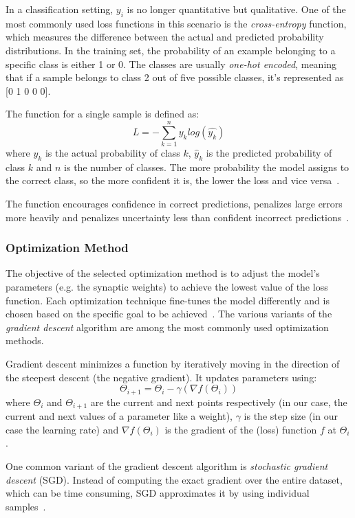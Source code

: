 \documentclass[a4paper,oneside,onecolumn,12pt]{book}
\begin{document}
		In a classification setting, $y_i$ is no longer quantitative but qualitative. One of the most commonly used loss functions in this scenario is the \textit{cross-entropy} function, which measures the difference between the actual and predicted probability distributions. In the training set, the probability of an example belonging to a specific class is either 1 or 0. The classes are usually \textit{one-hot encoded}, meaning that if a sample belongs to class 2 out of five possible classes, it's represented as [0 1 0 0 0].

		The function for a single sample is defined as:
		\[ L = -\sum_{k=1}^{n} y_k log(\hat{y_k}) \]
		where $y_k$ is the actual probability of class $k$, $\hat{y}_k$ is the predicted probability of class $k$ and $n$ is the number of classes. The more probability the model assigns to the correct class, so the more confident it is, the lower the loss and vice versa~\cite{AISL}.

		The function encourages confidence in correct predictions, penalizes large errors more heavily and penalizes uncertainty less than confident incorrect predictions~\cite{BOCEL}.

		\subsubsection{Optimization Method}
		The objective of the selected optimization method is to adjust the model's parameters (e.g. the synaptic weights) to achieve the lowest value of the loss function. Each optimization technique fine-tunes the model differently and is chosen based on the specific goal to be achieved~\cite{COOTMLT}. The various variants of the \textit{gradient descent} algorithm are among the most commonly used optimization methods.

		Gradient descent minimizes a function by iteratively moving in the direction of the steepest descent (the negative gradient). It updates parameters using:
		\[ \Theta_{i+1} = \Theta_{i} - \gamma(\nabla f(\Theta_i)) \]
		where $\Theta_{i}$ and $\Theta_{i+1}$ are the current and next points respectively (in our case, the current and next values of a parameter like a weight), $\gamma$ is the step size (in our case the learning rate) and $\nabla f(\Theta_i)$ is the gradient of the (loss) function $f$ at $\Theta_i$.

		One common variant of the gradient descent algorithm is \textit{stochastic gradient descent} (SGD). Instead of computing the exact gradient over the entire dataset, which can be time consuming, SGD approximates it by using individual samples~\cite{MML}.
\end{document}
